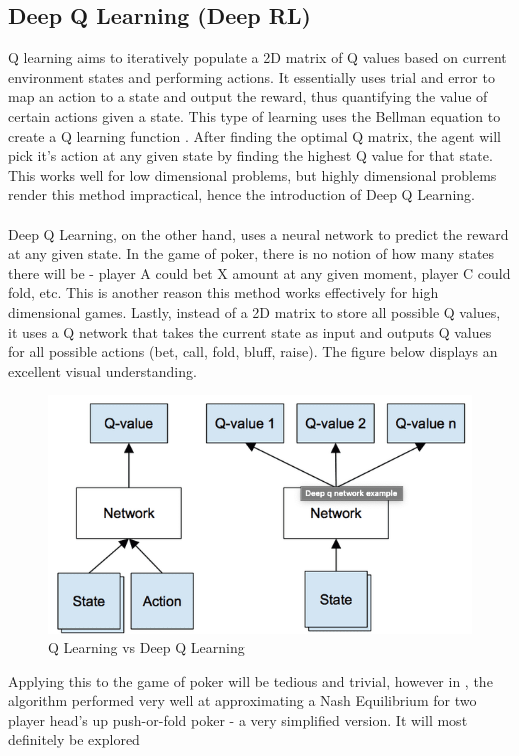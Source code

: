 \documentclass[12pt]{article}
\begin{document}
\subsection{Deep Q Learning (Deep RL)}
Q learning aims to iteratively populate a 2D matrix of Q values based on current environment states and performing actions. It essentially uses trial and error to map an action to a state and output the reward, thus quantifying the value of certain actions given a state. This type of learning uses the Bellman equation to create a Q learning function \cite{q}. After finding the optimal Q matrix, the agent will pick it's action at any given state by finding the highest Q value for that state. This works well for low dimensional problems, but highly dimensional problems render this method impractical, hence the introduction of Deep Q Learning.\\\\
Deep Q Learning, on the other hand, uses a neural network to predict the reward at any given state. In the game of poker, there is no notion of how many states there will be - player A could bet X amount at any given moment, player C could fold, etc. This is another reason this method works effectively for high dimensional games. Lastly, instead of a 2D matrix to store all possible Q values, it uses a Q network that takes the current state as input and outputs Q values for all possible actions (bet, call, fold, bluff, raise). The figure below displays an excellent visual understanding.
\begin{figure}[H]
    \centering
    \includegraphics[width=.70\linewidth]{figures/q}
    \caption{Q Learning vs Deep Q Learning \cite{q}}
    \label{fig:q}
\end{figure}
Applying this to the game of poker will be tedious and trivial, however in \cite{q}, the algorithm performed very well at approximating a Nash Equilibrium for two player head's up push-or-fold poker - a very simplified version. It will most definitely be explored 
\end{document}
